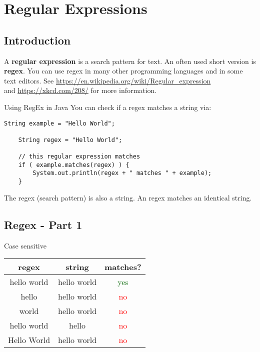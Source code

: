 \section{Regular Expressions}
\subsection{Introduction}
\begin{frame}{}
	A \textbf{regular expression} is a search pattern for text. An often used short version is \textbf{regex}.
	\vfill
	You can use regex in many other programming languages and in some text editors.
	\vfill
	See \url{https://en.wikipedia.org/wiki/Regular_expression} \\
	and \url{https://xkcd.com/208/} for more information.
\end{frame}

\begin{frame}[fragile]{Using RegEx in Java}
	You can check if a regex matches a string via:
	\begin{lstlisting}[basicstyle=\ttfamily\scriptsize]
	String example = "Hello World";
		
	String regex = "Hello World";
		
	// this regular expression matches
	if ( example.matches(regex) ) { 
	    System.out.println(regex + " matches " + example);
	}
	\end{lstlisting}
	The regex (search pattern) is also a string.
	\vfill
	An regex matches an identical string.
\end{frame}

\subsection{Regex - Part 1}
\begin{frame}{Case sensitive}
	\begin{tabular}{ c c | c }
		regex & string & matches? \\
		\hline
		hello world & hello world & \textcolor{darkgreen}{yes} \\
		hello & hello world & \textcolor{red}{no} \\
		world & hello world & \textcolor{red}{no} \\
		hello world & hello & \textcolor{red}{no} \\
		Hello World & hello world & \textcolor{red}{no} \\
	\end{tabular}
\end{frame}

